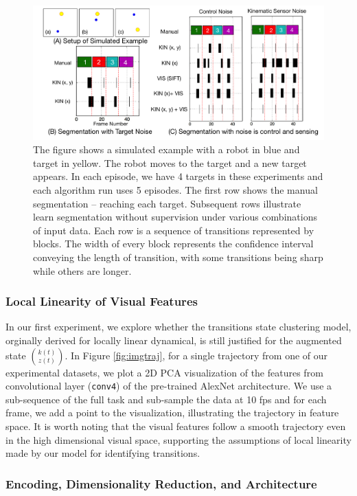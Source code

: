 \begin{figure}[!t]
\centering
\includegraphics[width=0.8\linewidth]{figures/toyEx}
\caption{The figure shows a simulated example with a robot in blue and target in yellow. The robot moves to the target and a new target appears. In each episode, we have 4 targets in these experiments and each algorithm run uses 5 episodes. The first row shows the manual segmentation -- reaching each target. Subsequent rows illustrate learn segmentation without supervision under various combinations of input data.  
Each row is a sequence of transitions represented by blocks. The width of every block represents the confidence interval conveying the length of transition, with some transitions being sharp while others are longer.}
\label{fig:toyEx}
\vspace{-15pt}
\end{figure}

\subsubsection{Local Linearity of Visual Features}
In our first experiment, we explore whether the transitions state clustering model, orginally derived for locally linear dynamical, is still justified for the augmented state $\binom{k(t)}{z(t)}$.
In Figure \ref{fig:imgtraj}, for a single trajectory from one of our experimental datasets, we plot a 2D PCA visualization of the features from convolutional layer (\texttt{conv4}) of the pre-trained AlexNet architecture. We use a sub-sequence of the full task and sub-sample the data at 10 fps and for each frame, we add a point to the visualization, illustrating the trajectory in feature space. It is worth noting that the visual features follow a smooth trajectory even in the high dimensional visual space, supporting the assumptions of local linearity made by our model for identifying transitions.


\subsubsection{Encoding, Dimensionality Reduction, and Architecture}

